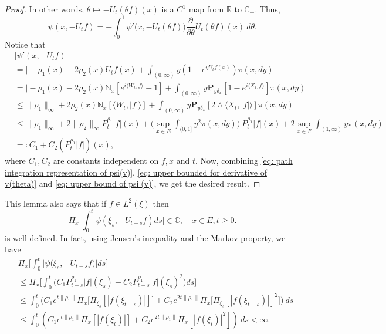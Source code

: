 \documentclass[12pt,a4paper]{amsart}
\theoremstyle{plain}
\theoremstyle{definition}
\numberwithin{equation}{section}
\begin{document}
\begin{proof}
    In other words, $\theta \mapsto -U_t(\theta f)(x)$ is a $C^1$ map from $\mathbb R$ to $\mathbb C_+$.
    Thus,
\begin{equation}
\label{eq: path integration representation of psi(v)}
    \psi(x,-U_tf)
    = -\int_0^1 \psi'\big(x,-U_t(\theta f)\big) \frac{\partial}{\partial \theta} U_t(\theta f)(x)~d\theta.
\end{equation}
    Notice that
\begin{align}
\label{eq: upper bound of psi'(v)}
    &|\psi'(x, -U_tf)|
    \\&= \Big| -\rho_1(x)- 2\rho_2(x) U_tf(x)+ \int_{(0,\infty)} y (1- e^{y U_tf(x)} ) \pi(x,dy)\Big|
    \\&= \Big| - \rho_1(x)- 2\rho_2(x)\mathbb N_x[e^{i \langle W_t, f\rangle} - 1]  + \int_{(0,\infty)} y \mathbf P_{y \delta_x}[1-e^{i \langle X_t, f\rangle}] \pi(x,dy) \Big|
    \\ &\leq \|\rho_1\|_\infty + 2\rho_2(x)\mathbb N_x[\langle W_t, |f|\rangle]+ \int_{(0,\infty)} y\mathbf P_{y\delta_x}[2\wedge \langle X_t, |f|\rangle] \pi(x,dy)
    \\ &\leq \|\rho_1\|_\infty + 2\|\rho_2\|_\infty
    P^{\rho_1}_t |f|(x) + \Big(\sup_{x\in E}\int_{(0,1]}y^2 \pi(x,dy)\Big)~P^{\rho_1}_t |f|(x) + 2\sup_{x\in E}\int_{(1,\infty)} y \pi(x,dy)
    \\ &=: C_1 + C_2(P^{\rho_1}_t |f|)(x),
\end{align}
    where $C_1, C_2$ are constants independent on $f,x$ and $t$.
    Now, combining \eqref{eq: path integration representation of psi(v)}, \eqref{eq: upper bounded for derivative of v(theta)} and \eqref{eq: upper bound of psi'(v)}, we get the desired result.
\end{proof}

    This lemma also says that if $f\in L^2(\xi)$ then
\[
    \Pi_x\Big[\int_0^t \psi(\xi_s,- U_{t-s}f)ds\Big]
    \in \mathbb C,
    \quad x\in E, t\geq 0.
\]
    is well defined.
    In fact, using Jensen's inequality and the Markov property, we have
\begin{align}
\label{eq: domination of psi(v)}
    &\Pi_x\Big[\int_0^t \big|\psi \big(\xi_s,-U_{t-s}f\big)\big|ds\Big]
    \\&\leq \Pi_x\Big[\int_0^t \big(C_1 P_{t-s}^{\rho_1}|f|(\xi_s)+C_2 P_{t-s}^{\rho_1}|f|(\xi_s)^2\big)ds\Big]
    \\ &\leq \int_0^t \big(C_1 e^{t\|\rho_1\|}\Pi_x \big[ \Pi_{\xi_s}[|f(\xi_{t-s})|] \big]+C_2 e^{2t\|\rho_1\|}\Pi_x \big[ \Pi_{\xi_s}[|f (\xi_{t-s})|]^2 \big]\big)~ds
    \\ &\leq \int_0^t (C_1 e^{t\|\rho_1\|}\Pi_x [ |f(\xi_{t})|]+C_2e^{2t\|\rho_1\|}\Pi_x [ |f (\xi_{t})|^2 ])~ds < \infty.
\end{align}
\end{document}
